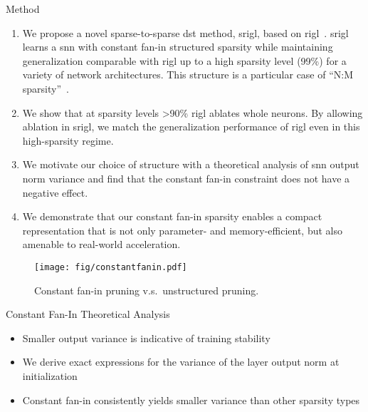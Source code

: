 \documentclass[final]{beamer}
\newlength{\colwidth}
\begin{document}
\begin{frame}[t]
\begin{columns}[t]
\begin{column}{\colwidth}
  \begin{block}{Method}
  \begin{enumerate}
        \item We propose a novel sparse-to-sparse \gls{dst} method, \gls{srigl}, based on \gls{rigl}~\citep{evci_rigging_2021}. \Gls{srigl} learns a \gls{snn} with constant fan-in structured sparsity while maintaining generalization comparable with \gls{rigl} up to a high sparsity level (99\%) for a variety of network architectures. This structure is a particular case of ``N:M sparsity''~\citep{NvidiaA100}.
        \item We show that at sparsity levels >90\% \gls{rigl} ablates whole neurons. By allowing ablation in \gls{srigl}, we match the generalization performance of \gls{rigl} even in this high-sparsity regime.
        \item We motivate our choice of structure with a theoretical analysis of \gls{snn} output norm variance and find that the constant fan-in constraint does not have a negative effect.
        \item We demonstrate that our constant fan-in sparsity enables a compact representation that is not only parameter- and memory-efficient, but also amenable to real-world acceleration.
    \end{enumerate}

    \begin{figure}
        \texttt{[image: fig/constantfanin.pdf]}
        \caption{Constant fan-in pruning v.s.\ unstructured pruning.}\label{fig:constfanin}
    \end{figure}

    \end{block}

  \begin{block}{Constant Fan-In Theoretical Analysis}
  \begin{itemize}
      \item Smaller output variance is indicative of training stability
      \item We derive exact expressions for the variance of the layer output norm at initialization
      \item Constant fan-in consistently yields smaller variance than other sparsity types
  \end{itemize}


\end{block}
\end{column}
\end{columns}
\end{frame}
\end{document}
